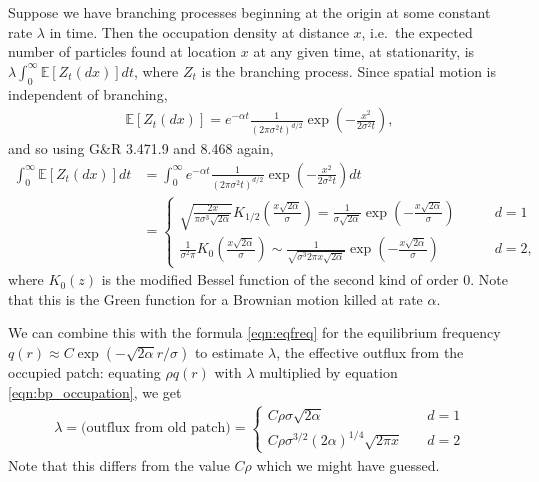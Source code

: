 \documentclass{article}
\newcommand{\E}{\mathbb{E}}
\begin{document}
Suppose we have branching processes beginning at the origin at some constant rate $\lambda$ in time.
Then the occupation density at distance $x$, i.e.\ the expected number of particles found at location $x$ at any given time, at stationarity,
is $\lambda \int_0^\infty \E[Z_t(dx)] dt$, where $Z_t$ is the branching process.
Since spatial motion is independent of branching,
\begin{align}
  \E[Z_t(dx)] = e^{-\alpha t} \frac{1}{(2\pi \sigma^2 t)^{d/2}} \exp\left(-\frac{x^2}{2\sigma^2 t} \right) ,
\end{align}
and so using G\&R 3.471.9 and 8.468 again,
\begin{align} \label{eqn:bp_occupation}
  \int_0^\infty \E[Z_t(dx)] dt  &= \int_0^\infty e^{-\alpha t} \frac{1}{(2\pi \sigma^2 t)^{d/2}} \exp\left(-\frac{x^2}{2\sigma^2 t} \right) dt \\
  &= \begin{cases}
    \sqrt{ \frac{ 2 x }{ \pi \sigma^{3} \sqrt{2\alpha} } }  K_{1/2} \left(\frac{x \sqrt{2\alpha}}{\sigma}\right) =
    \frac{1}{\sigma \sqrt{2 \alpha}} \exp\left( - \frac{ x \sqrt{2\alpha} }{ \sigma } \right) \qquad & d=1 \\
    \frac{1}{\sigma^2 \pi} K_0\left(\frac{x \sqrt{2\alpha}}{\sigma}\right) 
    \sim \frac{ 1 }{ \sqrt{ \sigma^3  2\pi x \sqrt{2\alpha} } } \exp\left(-\frac{x\sqrt{2\alpha}}{\sigma}\right) \qquad & d=2  ,
\end{cases} 
\end{align}
where $K_0(z)$ is the modified Bessel function of the second kind of order 0.
Note that this is the Green function for a Brownian motion killed at rate $\alpha$.

We can combine this with the formula \eqref{eqn:eqfreq} for the equilibrium frequency $q(r) \approx C \exp( -\sqrt{2 \alpha} r / \sigma)$
to estimate $\lambda$, the effective outflux from the occupied patch: equating $\rho q(r)$ with $\lambda$ multiplied by equation \eqref{eqn:bp_occupation}, we get
\begin{align} \label{eqn:outflux_from_patch}
    \lambda = \text{(outflux from old patch)} = \begin{cases}
        C \rho \sigma \sqrt{2\alpha} \quad & d=1 \\
    C \rho \sigma^{3/2} (2\alpha)^{1/4} \sqrt{2 \pi x} \quad & d=2 
    \end{cases}
\end{align}
Note that this differs from the value $C\rho$ which we might have guessed.
\end{document}
